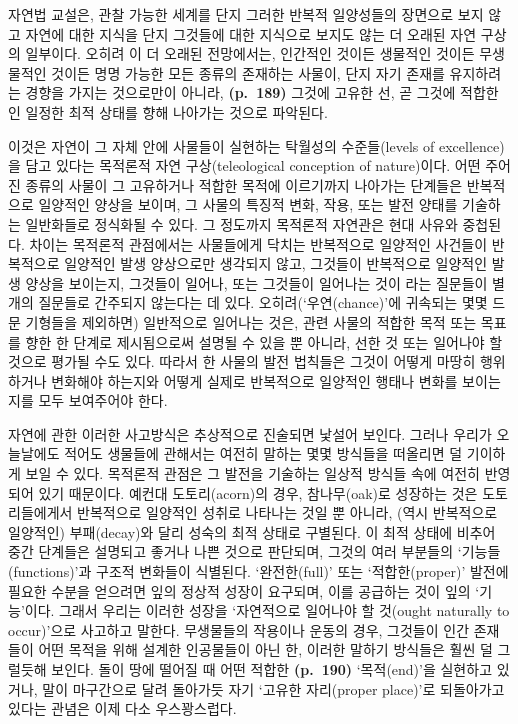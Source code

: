 자연법 교설은, 관찰 가능한 세계를 단지 그러한 반복적 일양성들의 장면으로
보지 않고 자연에 대한 지식을 단지 그것들에 대한 지식으로 보지도 않는 더
오래된 자연 구상의 일부이다. 오히려 이 더 오래된 전망에서는, 인간적인
것이든 생물적인 것이든 무생물적인 것이든 명명 가능한 모든 종류의
존재하는 사물이, 단지 자기 존재를 유지하려는 경향을 가지는 것으로만이
아니라, \textbf{(p.~189)} 그것에 고유한 선, 곧 그것에 적합한
인 일정한 최적 상태를 향해 나아가는 것으로 파악된다.

이것은 자연이 그 자체 안에 사물들이 실현하는 탁월성의 수준들(levels of
excellence)을 담고 있다는 목적론적 자연 구상(teleological conception of
nature)이다. 어떤 주어진 종류의 사물이 그 고유하거나 적합한 목적에
이르기까지 나아가는 단계들은 반복적으로 일양적인 양상을 보이며, 그
사물의 특징적 변화, 작용, 또는 발전 양태를 기술하는 일반화들로 정식화될
수 있다. 그 정도까지 목적론적 자연관은 현대 사유와 중첩된다. 차이는
목적론적 관점에서는 사물들에게 닥치는 반복적으로 일양적인 사건들이
 반복적으로 일양적인 발생 양상으로만 생각되지 않고,
그것들이  반복적으로 일양적인 발생 양상을 보이는지,
그것들이 일어나, 또는 그것들이 일어나는 것이
라는 질문들이 별개의 질문들로 간주되지 않는다는 데
있다. 오히려(‘우연(chance)’에 귀속되는 몇몇 드문 기형들을 제외하면)
일반적으로 일어나는 것은, 관련 사물의 적합한 목적 또는 목표를 향한 한
단계로 제시됨으로써 설명될 수 있을 뿐 아니라, 선한 것 또는 일어나야 할
것으로 평가될 수도 있다. 따라서 한 사물의 발전 법칙들은 그것이 어떻게
마땅히 행위하거나 변화해야 하는지와 어떻게 실제로 반복적으로 일양적인
행태나 변화를 보이는지를 모두 보여주어야 한다.

자연에 관한 이러한 사고방식은 추상적으로 진술되면 낯설어 보인다. 그러나
우리가 오늘날에도 적어도 생물들에 관해서는 여전히 말하는 몇몇 방식들을
떠올리면 덜 기이하게 보일 수 있다. 목적론적 관점은 그 발전을 기술하는
일상적 방식들 속에 여전히 반영되어 있기 때문이다. 예컨대 도토리(acorn)의
경우, 참나무(oak)로 성장하는 것은 도토리들에게서 반복적으로 일양적인
성취로 나타나는 것일 뿐 아니라, (역시 반복적으로 일양적인) 부패(decay)와
달리 성숙의 최적 상태로 구별된다. 이 최적 상태에 비추어 중간 단계들은
설명되고 좋거나 나쁜 것으로 판단되며, 그것의 여러 부분들의
‘기능들(functions)’과 구조적 변화들이 식별된다. ‘완전한(full)’ 또는
‘적합한(proper)’ 발전에 필요한 수분을 얻으려면 잎의 정상적 성장이
요구되며, 이를 공급하는 것이 잎의 ‘기능’이다. 그래서 우리는 이러한
성장을 ‘자연적으로 일어나야 할 것(ought naturally to occur)’으로
사고하고 말한다. 무생물들의 작용이나 운동의 경우, 그것들이 인간 존재들이
어떤 목적을 위해 설계한 인공물들이 아닌 한, 이러한 말하기 방식들은 훨씬
덜 그럴듯해 보인다. 돌이 땅에 떨어질 때 어떤 적합한 \textbf{(p.~190)}
‘목적(end)’을 실현하고 있거나, 말이 마구간으로 달려 돌아가듯 자기
‘고유한 자리(proper place)’로 되돌아가고 있다는 관념은 이제 다소
우스꽝스럽다.

